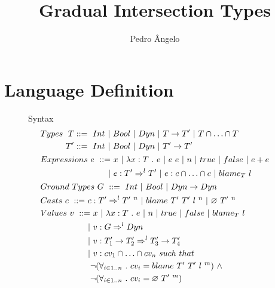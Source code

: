 \documentclass[a4paper]{article}
\begin{document}
\title{Gradual Intersection Types}

\author{Pedro Ângelo}

\maketitle
{}

\section{Language Definition}
\begin{figure}[H]
Syntax
\begin{align*}
&Types\ \begin{aligned}[t] T &::=\ \Int\ |\ \Bool\ |\ \Dyn\ |\ T \rightarrow T'\ |\ T \cap \ldots \cap T\\
                          T' &::=\ \Int\ |\ \Bool\ |\ \Dyn\ |\ T' \rightarrow T' \end{aligned}\\
&Expressions\ \begin{aligned}[t] e\ ::=&\ x\ |\ \lambda x : T\ .\ e\ |\ e\ e\ |\ n\ |\ \true\ |\ \false\ |\ e + e\\
                                      |&\ e : T' \Rightarrow^l T'\ |\ e : c \cap \ldots \cap c\ |\ \blame{T}{l} \end{aligned}\\
&Ground\ Types\ G\ ::=\ \Int\ |\ \Bool\ |\ \Dyn \rightarrow \Dyn\\
&Casts\ \begin{aligned}[t] c\ ::=&\ c : T' \Rightarrow^l T'\ ^n\ |\ \blamecast{T'}{T'}{l}{n}\ |\ \emptycast{T'}{n}\ \iffalse |\ \stuckcast{T'}{T'}{n}\fi \end{aligned}\\
&Values\ \begin{aligned}[t] v\ ::=&\ x\ |\ \lambda x : T\ .\ e\ |\ n\ |\ \true\ |\ \false\ |\ \blame{T}{l}\\
                                 |&\ v : G \Rightarrow^l \Dyn\\
                                 |&\ v : T'_1 \rightarrow T'_2 \Rightarrow^l T'_3 \rightarrow T'_4\\
                                 |&\ v : cv_1 \cap \ldots \cap cv_n\ such\ that\\
                                 &\neg(\forall_{i\in 1..n}\ .\ cv_i = \blamecast{T'}{T'}{l}{m})\ \land\\
                                 &\neg(\forall_{i\in 1..n}\ .\ cv_i = \emptycast{T'}{m}) \end{aligned}\\

\end{align*}
\end{figure}
\end{document}

